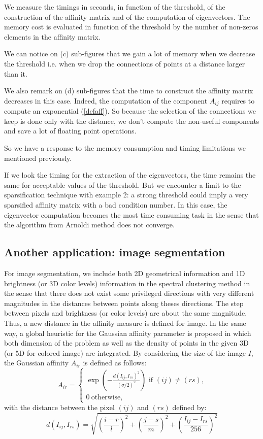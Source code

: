 \documentclass{llncs}
\begin{document}
We measure the timings in seconds, in function of the threshold, of the
construction of the affinity matrix and of the computation of eigenvectors.
The memory cost is evaluated in function of the threshold by the number of
non-zeros elements in the affinity matrix.

We can notice on (c) sub-figures that we gain a lot of memory when we decrease
the threshold i.e.  when we drop the connections of points at a distance larger
than it.

We also remark on (d) sub-figures that the time to construct the affinity matrix decreases in
this case. Indeed, the computation of the component $A_{ij}$ requires to
compute an exponential (\ref{defaff}). So because the selection of the connections
we keep is done only with the distance, we don't compute the non-useful
components and save a lot of floating point operations.

So we have a response to the memory consumption and timing limitations we
mentioned previously.

If we look the timing for the extraction of the eigenvectors, the time
remains the same for acceptable values of the threshold.
But we encounter a limit to the sparsification technique with example 2: a
strong threshold could imply a very sparsified affinity matrix with a bad
condition number.
In this case, the eigenvector computation becomes the most time consuming
task in the sense that the algorithm from Arnoldi method does not converge.

\subsection{Another application: image segmentation} \label{image}

For image segmentation, we include both 2D geometrical information and 1D 
brightness (or 3D color levels) information in the spectral clustering method
in the sense that there does not exist some privileged directions with very
different magnitudes in the distances between points along theses directions.
The step between pixels and brightness (or color levels) are about the same
magnitude.
Thus, a new distance in the affinity measure is defined for image. In the same
way, a global heuristic for the Gaussian affinity parameter is proposed in
which both dimension of the problem as  well as the density of points in the
given 3D (or 5D for colored image) are integrated.  By considering the size of
the image $I$, the Gaussian affinity $A_{ir}$ is defined as follows:
\begin{equation}
A_{ir}=\begin{cases}
\exp\left(-\frac{d\left(I_{ij},I_{rs}\right)^2}{(\sigma/2)^2}\right) \text{\  if $(ij)\neq (rs)$,}\\ 
0 \ \text{otherwise,} \nonumber
\end{cases}
\end{equation}
with the distance between the pixel $(ij)$ and $(rs)$ defined by:
\begin{equation}
d\left(I_{ij},I_{rs}\right)=\sqrt{\left(\frac{i-r}{l}\right)^2+\left(\frac{j-s}{m}\right)^2+\left(\frac{I_{ij}-I_{rs}}{256}\right)^2}
\label{puceaff}
\end{equation}
\end{document}
